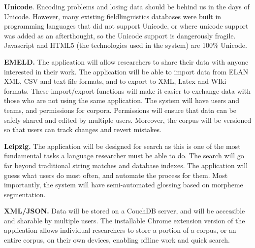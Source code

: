 \documentclass[letterpaper, 12pt, dvips]{mitwpl}
\begin{document}
\begin{description}
\item {\bf Unicode}. Encoding problems and losing data should be behind us in the days of Unicode. However, many existing fieldlinguistics databases were built in programming languages that did not support Unicode, or where unicode support was added as an afterthought, so the Unicode support is dangerously fragile. Javascript and HTML5 (the technologies used in the system) are 100\% Unicode.


\item {\bf EMELD.} The application will allow researchers to share their data with anyone interested in their work. The application will be able to import data from ELAN XML, CSV and text file formats, and to export to XML, Latex and WIki formats. These import/export functions will make it easier to exchange data with those who are not using the same application.  The system will have users and teams, and permissions for corpora. Permissions will ensure that data can be safely shared and edited by multiple users. Moreover, the corpus will be versioned so that users can track changes and revert mistakes.


\item {\bf  Leipzig.} The application will be designed for search as this is one of the most fundamental tasks a language researcher must be able to do. The search will go far beyond traditional string matches and database indexes. The application will guess what users do most often, and automate the process for them. Most importantly, the system will have semi-automated  glossing based on morpheme segmentation.


\item {\bf XML/JSON.} Data will be stored on a CouchDB server, and will be accessible and sharable by multiple users.  The installable Chrome extension version of the application allows individual researchers to store a portion of a corpus, or an entire corpus, on their own devices, enabling offline work and quick search. 

\end{description}
\end{document}
